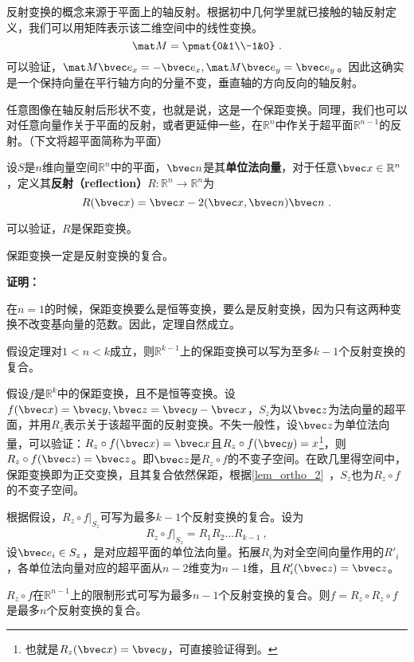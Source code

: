 反射变换的概念来源于平面上的轴反射。根据初中几何学里就已接触的轴反射定义，我们可以用矩阵表示该二维空间中的线性变换。
\begin{equation}
\mat M=\pmat{0&1\\-1&0}~.
\end{equation}
可以验证，$\mat M\bvec e_x=-\bvec e_x,\mat M \bvec e_y=\bvec e_y$。因此这确实是一个保持向量在平行轴方向的分量不变，垂直轴的方向反向的轴反射。

任意图像在轴反射后形状不变，也就是说，这是一个保距变换。同理，我们也可以对任意向量作关于平面的反射，或者更延伸一些，在$\mathbb R^n$中作关于超平面$\mathbb R^{n-1}$的反射。（下文将超平面简称为平面）
\begin{definition}{}
设$S$是$n$维向量空间$\mathbb R^n$中的平面，$\bvec n$是其\textbf{单位法向量}，对于任意$\bvec x\in \mathbb R^n$，定义其\textbf{反射（reflection）}$R:\mathbb R^n\rightarrow \mathbb R^n$为
\begin{equation}
R(\bvec x)=\bvec x-2(\bvec x,\bvec n)\bvec n~.
\end{equation}
\end{definition}
可以验证，$R$是保距变换。


\begin{theorem}{}
保距变换一定是反射变换的复合。
\end{theorem}
\textbf{证明：}

在$n=1$的时候，保距变换要么是恒等变换，要么是反射变换，因为只有这两种变换不改变基向量的范数。因此，定理自然成立。

假设定理对$1<n<k$成立，则$\mathbb R^{k-1}$上的保距变换可以写为至多$k-1$个反射变换的复合。 

假设$f$是$\mathbb R^k$中的保距变换，且不是恒等变换。设$f(\bvec x)=\bvec y,\bvec z=\bvec y-\bvec x$，$S_z$为以$\bvec z$为法向量的超平面，并用$R_z$表示关于该超平面的反射变换。不失一般性，设$\bvec z$为单位法向量，可以验证：$R_z\circ f(\bvec x)=\bvec x$且$R_z\circ f(\bvec y)=x$\footnote{也就是$R_z(\bvec x)=\bvec y$，可直接验证得到。}，则$R_z\circ f(\bvec z)=\bvec z$。即$\bvec z$是$R_z\circ f$的不变子空间。在欧几里得空间中，保距变换即为正交变换，且其复合依然保距，根据\autoref{lem_ortho_2}~，$S_z$也为$R_z\circ f$的不变子空间。

根据假设，$R_z\circ f|_{S_z}$可写为最多$k-1$个反射变换的复合。设为
\begin{equation}
R_z\circ f|_{S_z}=R_1R_2...R_{k-1}~,
\end{equation}
设$\bvec e_i\in S_z$，是对应超平面的单位法向量。拓展$R_i$为对全空间向量作用的$R'_i$，各单位法向量对应的超平面从$n-2$维变为$n-1$维，且$R'_i(\bvec z)=\bvec z$。

$R_z\circ f$在$\mathbb R^{n-1}$上的限制形式可写为最多$n-1$个反射变换的复合。则$f=R_z\circ R_z\circ f$是最多$n$个反射变换的复合。